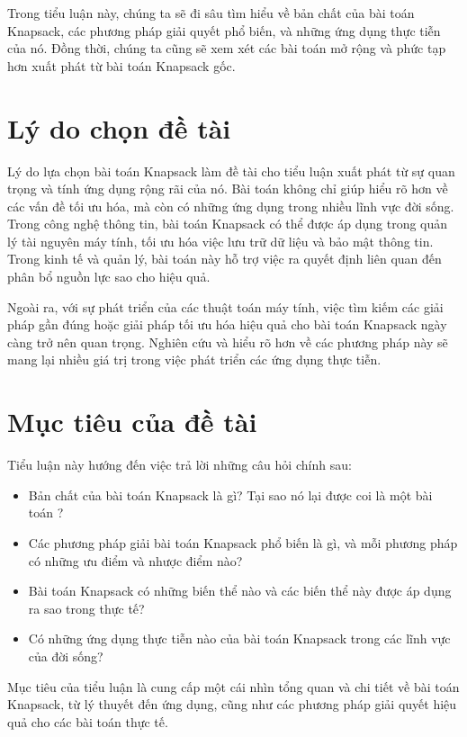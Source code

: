 Trong tiểu luận này, chúng ta sẽ đi sâu tìm hiểu về bản chất của bài toán Knapsack, các phương pháp giải quyết phổ biến, và những ứng dụng thực tiễn của nó. Đồng thời, chúng ta cũng sẽ xem xét các bài toán mở rộng và phức tạp hơn xuất phát từ bài toán Knapsack gốc.

\section{Lý do chọn đề tài}
Lý do lựa chọn bài toán Knapsack làm đề tài cho tiểu luận xuất phát từ sự quan trọng và tính ứng dụng rộng rãi của nó. Bài toán không chỉ giúp hiểu rõ hơn về các vấn đề tối ưu hóa, mà còn có những ứng dụng trong nhiều lĩnh vực đời sống. Trong công nghệ thông tin, bài toán Knapsack có thể được áp dụng trong quản lý tài nguyên máy tính, tối ưu hóa việc lưu trữ dữ liệu và bảo mật thông tin. Trong kinh tế và quản lý, bài toán này hỗ trợ việc ra quyết định liên quan đến phân bổ nguồn lực sao cho hiệu quả.

Ngoài ra, với sự phát triển của các thuật toán máy tính, việc tìm kiếm các giải pháp gần đúng hoặc giải pháp tối ưu hóa hiệu quả cho bài toán Knapsack ngày càng trở nên quan trọng. Nghiên cứu và hiểu rõ hơn về các phương pháp này sẽ mang lại nhiều giá trị trong việc phát triển các ứng dụng thực tiễn.

\section{Mục tiêu của đề tài}
Tiểu luận này hướng đến việc trả lời những câu hỏi chính sau:
\begin{itemize}
    \item Bản chất của bài toán Knapsack là gì? Tại sao nó lại được coi là một bài toán ?
    \item Các phương pháp giải bài toán Knapsack phổ biến là gì, và mỗi phương pháp có những ưu điểm và nhược điểm nào?
    \item Bài toán Knapsack có những biến thể nào và các biến thể này được áp dụng ra sao trong thực tế?
    \item Có những ứng dụng thực tiễn nào của bài toán Knapsack trong các lĩnh vực của đời sống?
\end{itemize}
Mục tiêu của tiểu luận là cung cấp một cái nhìn tổng quan và chi tiết về bài toán Knapsack, từ lý thuyết đến ứng dụng, cũng như các phương pháp giải quyết hiệu quả cho các bài toán thực tế.

